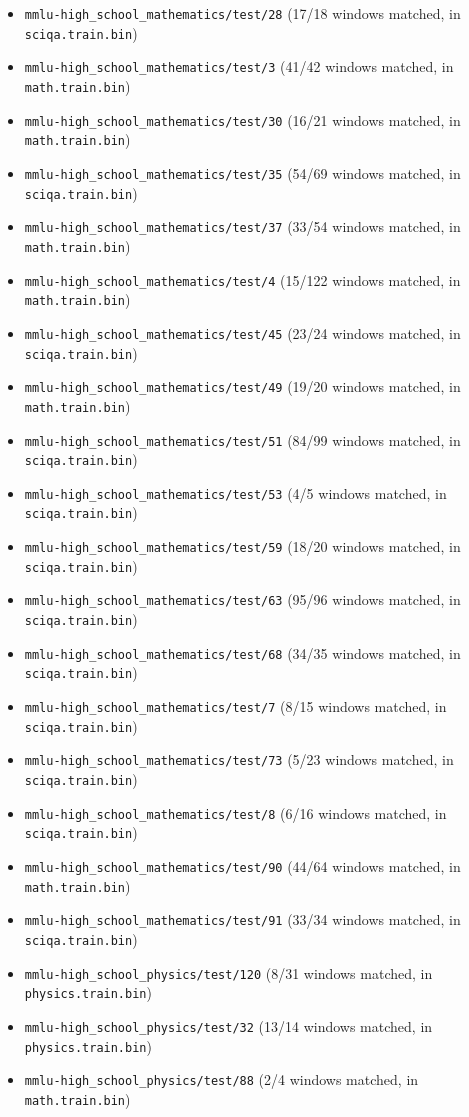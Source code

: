 \begin{itemize}
\item \texttt{mmlu-high\_school\_mathematics/test/28} (17/18 windows matched, in \texttt{sciqa.train.bin})
\item \texttt{mmlu-high\_school\_mathematics/test/3} (41/42 windows matched, in \texttt{math.train.bin})
\item \texttt{mmlu-high\_school\_mathematics/test/30} (16/21 windows matched, in \texttt{math.train.bin})
\item \texttt{mmlu-high\_school\_mathematics/test/35} (54/69 windows matched, in \texttt{sciqa.train.bin})
\item \texttt{mmlu-high\_school\_mathematics/test/37} (33/54 windows matched, in \texttt{math.train.bin})
\item \texttt{mmlu-high\_school\_mathematics/test/4} (15/122 windows matched, in \texttt{math.train.bin})
\item \texttt{mmlu-high\_school\_mathematics/test/45} (23/24 windows matched, in \texttt{sciqa.train.bin})
\item \texttt{mmlu-high\_school\_mathematics/test/49} (19/20 windows matched, in \texttt{math.train.bin})
\item \texttt{mmlu-high\_school\_mathematics/test/51} (84/99 windows matched, in \texttt{sciqa.train.bin})
\item \texttt{mmlu-high\_school\_mathematics/test/53} (4/5 windows matched, in \texttt{sciqa.train.bin})
\item \texttt{mmlu-high\_school\_mathematics/test/59} (18/20 windows matched, in \texttt{sciqa.train.bin})
\item \texttt{mmlu-high\_school\_mathematics/test/63} (95/96 windows matched, in \texttt{sciqa.train.bin})
\item \texttt{mmlu-high\_school\_mathematics/test/68} (34/35 windows matched, in \texttt{sciqa.train.bin})
\item \texttt{mmlu-high\_school\_mathematics/test/7} (8/15 windows matched, in \texttt{sciqa.train.bin})
\item \texttt{mmlu-high\_school\_mathematics/test/73} (5/23 windows matched, in \texttt{sciqa.train.bin})
\item \texttt{mmlu-high\_school\_mathematics/test/8} (6/16 windows matched, in \texttt{sciqa.train.bin})
\item \texttt{mmlu-high\_school\_mathematics/test/90} (44/64 windows matched, in \texttt{math.train.bin})
\item \texttt{mmlu-high\_school\_mathematics/test/91} (33/34 windows matched, in \texttt{sciqa.train.bin})
\item \texttt{mmlu-high\_school\_physics/test/120} (8/31 windows matched, in \texttt{physics.train.bin})
\item \texttt{mmlu-high\_school\_physics/test/32} (13/14 windows matched, in \texttt{physics.train.bin})
\item \texttt{mmlu-high\_school\_physics/test/88} (2/4 windows matched, in \texttt{math.train.bin})
\end{itemize}
